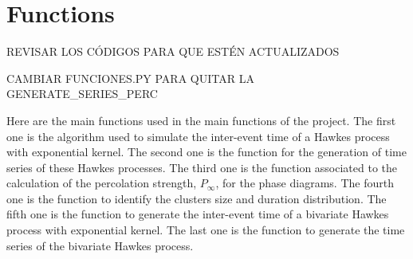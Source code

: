 \chapter{Functions}\label{ch:Anexo}
\begin{Large}
    REVISAR LOS CÓDIGOS PARA QUE ESTÉN ACTUALIZADOS

    CAMBIAR FUNCIONES.PY PARA QUITAR LA GENERATE\_SERIES\_PERC
\end{Large}
Here are the main functions used in the main functions of the project. The first one is the algorithm used to simulate the inter-event time of a Hawkes process with exponential kernel. 
The second one is the function for the generation of time series of these Hawkes processes. The third one is the function associated to the calculation of the percolation strength, $P_\infty$,
for the phase diagrams. The fourth one is the function to identify the clusters size and duration distribution. The fifth one is the function to generate the inter-event time of a 
bivariate Hawkes process with exponential kernel. The last one is the function to generate the time series of the bivariate Hawkes process. 


